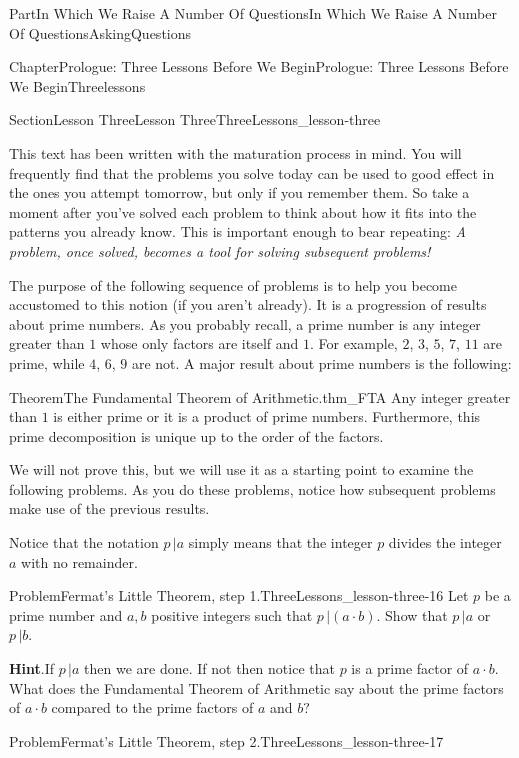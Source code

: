 \documentclass[oneside,10pt,]{book}
\newcommand{\blocktitlefont}{\relax}
\numberwithin{equation}{part}
\begin{document}
\begin{partptx}{Part}{In Which We Raise A Number Of Questions}{}{In Which We Raise A Number Of Questions}{}{}{AskingQuestions}
\begin{chapterptx}{Chapter}{Prologue: Three Lessons Before We Begin}{}{Prologue: Three Lessons Before We Begin}{}{}{Threelessons}
\begin{sectionptx}{Section}{Lesson Three}{}{Lesson Three}{}{}{ThreeLessons_lesson-three}
\par
This text has been written with the maturation process in mind. You will frequently find that the problems you solve today can be used to good effect in the ones you attempt tomorrow, but only if you remember them.  So take a moment after you've solved each problem to think about how it fits into the patterns you already know.  This is important enough to bear repeating: \emph{A problem, once solved, becomes a tool for solving subsequent problems!}%
\par
The purpose of the following sequence of problems is to help you become accustomed to this notion (if you aren't already).  It is a progression of results about prime numbers.  As you probably recall, a prime number is any integer greater than \(1\) whose only factors are itself and \(1\).  For example, \(2\), \(3\), \(5\), \(7\), \(11\) are prime, while \(4\), \(6\), \(9\) are not.  A major result about prime numbers is the following:%
\begin{theorem}{Theorem}{The Fundamental Theorem of Arithmetic.}{}{thm_FTA}%
Any integer greater than \(1\) is either prime or it is a product of prime numbers.  Furthermore, this prime decomposition is unique up to the order of the factors.%
\end{theorem}
We will not prove this, but we will use it as a starting point to examine the following problems.  As you do these problems, notice how subsequent problems make use of the previous results.%
\par
Notice that the notation \(p\,|a\) simply means that the integer \(p\) divides the integer \(a\) with no remainder.%
\begin{problem}{Problem}{Fermat's Little Theorem, step 1.}{ThreeLessons_lesson-three-16}%
 Let \(p\) be a prime number and \(a, b\) positive integers such that \(p\, | (a\cdot b)\).  Show that \(p\,|a\) or \(p\,|b\).%
\par\smallskip%
\noindent\textbf{\blocktitlefont Hint}.\hypertarget{ThreeLessons_lesson-three-16-3}{}\quad{}If \(p\,|a\) then we are done.  If not then notice that \(p\) is a prime factor of \(a\cdot b\).  What does the Fundamental Theorem of Arithmetic say about the prime factors of \(a\cdot b\) compared to the prime factors of \(a\) and \(b?\)%
\end{problem}
\begin{problem}{Problem}{Fermat's Little Theorem, step 2.}{ThreeLessons_lesson-three-17}%

\end{problem}
\end{sectionptx}
\end{chapterptx}
\end{partptx}
\end{document}
